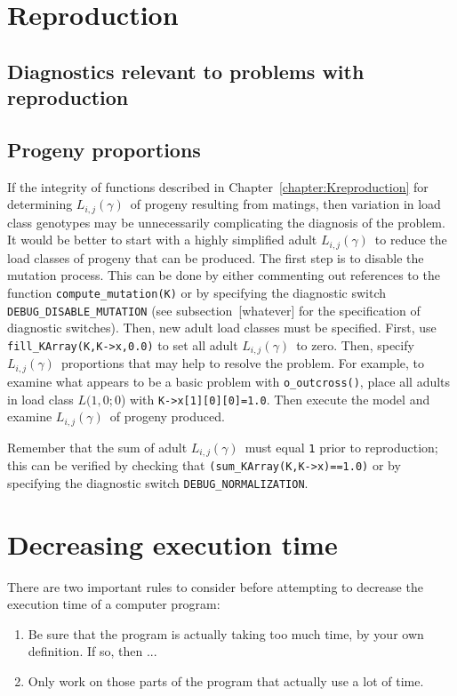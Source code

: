 \documentclass[10pt,twoside,a4paper,fleqn]{report}
\numberwithin{equation}{section}  %
\newcommand{\LCG}[3]{\mbox{$L(#1,#2;#3$)}}
\newcommand{\Lijg}{\mbox{$L_{i,j}(\gamma)$}}     %
\begin{document}
{\section{Reproduction}

\subsection{Diagnostics relevant to problems with reproduction}

\subsection{Progeny proportions}

If the integrity of functions described in Chapter~\ref{chapter:Kreproduction}
for determining \Lijg\ of progeny resulting from matings, then variation in
load class genotypes may be unnecessarily complicating the diagnosis of the
problem.  It would be better to start with a highly simplified adult \Lijg\ to
reduce the load classes of progeny that can be produced.  The first step is to
disable the mutation process.  This can be done by either commenting out
references to the function \lstinline{compute_mutation(K)} or by specifying the
diagnostic switch \lstinline{DEBUG_DISABLE_MUTATION} (see subsection~[whatever]
for the specification of diagnostic switches).  Then, new adult load classes
must be specified.  First, use \lstinline{fill_KArray(K,K->x,0.0)} to set all
adult \Lijg\ to zero.  Then, specify \Lijg\ proportions that may help to
resolve the problem.  For example, to examine what appears to be a basic
problem with \lstinline{o_outcross()}, place all adults in load class
\LCG{1}{0}{0} with \lstinline{K->x[1][0][0]=1.0}.  Then execute the model and
examine \Lijg\ of progeny produced.

Remember that the sum of adult \Lijg\ must equal \lstinline{1} prior to
reproduction; this can be verified by checking that
\lstinline{(sum_KArray(K,K->x)==1.0)} or by specifying the diagnostic switch
\lstinline{DEBUG_NORMALIZATION}.

\section{Decreasing execution time}

There are two important rules to consider before attempting to decrease the
execution time of a computer program:

\begin{enumerate}
	\item \label{ruletoomuch} Be sure that the program is actually taking too much time, by your own definition.  If so, then ...
	\item \label{rulefocus} Only work on those parts of the program that actually use a lot of time.
\end{enumerate}

}
\end{document}
